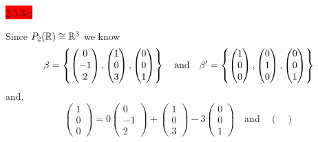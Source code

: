 \documentclass{exam}
\begin{document}
  \colorbox{red}{\underline{$2.5.3c$}:}
  \begin{solution}
    Since $P_2(\mathbb R) \cong \mathbb R^3$ we know 
    \[
      \beta = \left\{
        \begin{pmatrix}
          0 \\ -1 \\ 2
        \end{pmatrix},
        \begin{pmatrix}
          1 \\ 0 \\ 3
        \end{pmatrix},
        \begin{pmatrix}
          0 \\ 0 \\ 1
        \end{pmatrix}
       \right\}
      \quad\text{and}\quad
      \beta' = \left\{
        \begin{pmatrix}
          1 \\ 0 \\ 0
        \end{pmatrix},
        \begin{pmatrix}
          0 \\ 1 \\ 0
        \end{pmatrix},
        \begin{pmatrix}
          0 \\ 0 \\ 1
        \end{pmatrix}
       \right\}
    \]
    and, 
    \[
        \begin{pmatrix}
          1 \\ 0 \\ 0
        \end{pmatrix} 
        = 0 \begin{pmatrix}
          0 \\ -1 \\ 2
        \end{pmatrix}
        + \begin{pmatrix}
          1 \\ 0 \\ 3
        \end{pmatrix}
        - 3 \begin{pmatrix}
          0 \\ 0 \\ 1
        \end{pmatrix}
        \quad\text{and}\quad
        \begin{pmatrix}

\end{pmatrix}\]
\end{solution}
\end{document}
